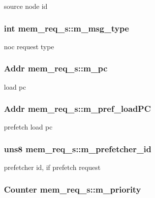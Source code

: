 \label{structmem__req__s_a858166c5e9fa9c8078088c6e04941a9f}
source node id \hypertarget{structmem__req__s_ad9e7fb008600b23a34448c1cb8efe835}{
\subsubsection[{m\_\-msg\_\-type}]{\setlength{\rightskip}{0pt plus 5cm}int {\bf mem\_\-req\_\-s::m\_\-msg\_\-type}}}
\label{structmem__req__s_ad9e7fb008600b23a34448c1cb8efe835}
noc request type \hypertarget{structmem__req__s_a94e91af0e42f5b41778fed51aa5614c7}{
\subsubsection[{m\_\-pc}]{\setlength{\rightskip}{0pt plus 5cm}Addr {\bf mem\_\-req\_\-s::m\_\-pc}}}
\label{structmem__req__s_a94e91af0e42f5b41778fed51aa5614c7}
load pc \hypertarget{structmem__req__s_aa33fc982a960ecccb76d44fc0d3ac039}{
\subsubsection[{m\_\-pref\_\-loadPC}]{\setlength{\rightskip}{0pt plus 5cm}Addr {\bf mem\_\-req\_\-s::m\_\-pref\_\-loadPC}}}
\label{structmem__req__s_aa33fc982a960ecccb76d44fc0d3ac039}
prefetch load pc \hypertarget{structmem__req__s_a230c4f2a949162d7417337f4a06ac14c}{
\subsubsection[{m\_\-prefetcher\_\-id}]{\setlength{\rightskip}{0pt plus 5cm}uns8 {\bf mem\_\-req\_\-s::m\_\-prefetcher\_\-id}}}
\label{structmem__req__s_a230c4f2a949162d7417337f4a06ac14c}
prefetcher id, if prefetch request \hypertarget{structmem__req__s_af7a1252bce4c150639539ba1551a3d33}{
\subsubsection[{m\_\-priority}]{\setlength{\rightskip}{0pt plus 5cm}Counter {\bf mem\_\-req\_\-s::m\_\-priority}}}
